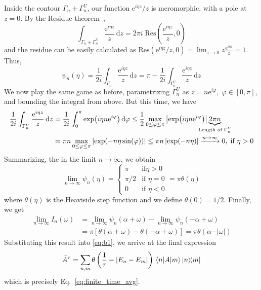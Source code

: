Inside the contour \(\Gamma _n + \Gamma_n^U\), our function \(\mathrm{e}^{i \eta z}/z \) is meromorphic, with 
a pole at \(z=0\).  By the Residue theorem~\autocite{Byron1992, Rudin1987},
\begin{equation}
    \int_{\Gamma _n+\Gamma _n^U} \frac{\mathrm{e}^{i \eta z} }{z}\,\mathrm{d}z = 2 \pi  i\; \mathrm{Res} \left( \frac{\mathrm{e}^{i \eta z}}{z}, 0 \right)
\end{equation}
and the residue can be easily calculated as \(\mathrm{Res} \left( \mathrm{e}^{i \eta z}/z, 0 \right) = 
\lim_{z \to 0} z \frac{\mathrm{e}^{i \eta z}}{z} = 1\). Thus,
\begin{equation}
    \psi_n(\eta ) = \frac{1}{2i}\int_{\Gamma _n} \frac{\mathrm{e}^{i \eta  z} }{z} \,\mathrm{d}z = \pi - \frac{1}{2i} \int_{\Gamma _n^U} \frac{\mathrm{e}^{i \eta z}}{z}\,\mathrm{d}z 
\end{equation}
We now play the same game as before, parametrizing \(\Gamma _n^U\) as \(z = n \mathrm{e}^{i \varphi },\; \varphi  \in \left[ 0, \pi  \right]  \), and
bounding the integral from above. But this time, we have
\begin{align}
    \frac{1}{2i} \int_{\Gamma _n^U} \frac{\mathrm{e}^{i \eta z}}{z}\,\mathrm{d}z &= \frac{1}{2i} \int_{0}^{\pi } \exp({i \eta n \mathrm{e}^{i \varphi } }) \,\mathrm{d}\varphi 
    \leq \frac{1}{2} \max_{0 \leq \varphi \leq \pi } \abs{\exp ( i \eta n \mathrm{e}^{i \varphi } ) } \underbrace{2 \pi  n}_{\mathclap{\text{Length of }\Gamma _n^U}} \nonumber\\
    &= \pi  n \max_{0 \leq \varphi \leq \pi } \left\vert \exp (-n \eta \sin (\varphi )) \right\vert \leq \pi  n \left\vert \exp (-n \eta ) \right\vert \xrightarrow{n\to \infty } 0, \; \text{if } \eta  > 0
\end{align}
Summarizing, the in the limit \(n \to \infty \), we obtain
\begin{equation}
    \lim_{n \to \infty}  \psi _n(\eta ) = \begin{cases}
        \pi & \text{if} \eta > 0 \\
        \pi /2 & \text{if } \eta  = 0 \\
        0 & \text{if } \eta  < 0
    \end{cases}
    = \pi \theta (\eta )
\end{equation} 
where \(\theta (\eta )\) is the Heaviside step function and we define \(\theta (0) = 1/2\).  Finally, we get
\begin{align}
    \lim_{n \to \infty} I_n(\omega ) &= \lim_{n \to \infty} \psi _n(\alpha + \omega ) - \lim_{n \to \infty} \psi _n(-\alpha +\omega )\nonumber\\
    &= \pi \left[ \theta (\alpha +\omega ) - \theta(-\alpha +\omega ) \right] = \pi \theta (\alpha - \vert \omega  \vert )
\end{align}
Substituting this result into \eqref{eq:b1}, we arrive at the final expression
\begin{equation}
    \bar{A}^{\tau } = \sum_{n,m} \theta \left( \frac{1}{\tau }- \left\vert E_n - E_m \right\vert  \right)   \matrixel{n}{A}{m} \ketbra{n}{m}
\end{equation}
which is precisely Eq.~\eqref{eq:finite_time_avg}.